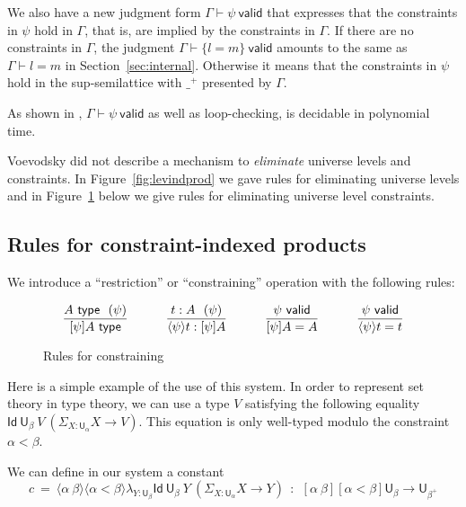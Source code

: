 \documentclass[11pt,a4paper]{article}
\theoremstyle{definition}
\newcommand{\Id}{\mathsf{Id}}
\newcommand{\UU}{\mathsf{U}}
\newcommand{\valid}{\mathsf{valid}}
\newcommand{\type}{\mathsf{type}}
\newcommand{\lam}[1]{{\langle}#1{\rangle}}
\newcommand{\set}[1]{\{#1\}}
\begin{document}

We also have a new judgment form $\Gamma\vdash\psi~\valid$ that expresses 
that the constraints in $\psi$ hold in $\Gamma$, that is,
are implied by the constraints in $\Gamma$. If there are
no constraints in $\Gamma$, the judgment $\Gamma\vdash\set{l=m}~\valid$
amounts to the same as $\Gamma\vdash l=m$ in Section~\ref{sec:internal}.
Otherwise it means that the constraints in $\psi$ hold in the 
sup-semilattice with $\_^+$ presented by $\Gamma$.

As shown in \cite{bezem-coquand:lattices}, $\Gamma\vdash\psi~\valid$
as well as loop-checking, is decidable in polynomial time.


Voevodsky \cite {VV} did not describe a mechanism to {\em eliminate}
universe levels and constraints. {\color{red}In Figure~\ref{fig:levindprod} we
gave rules for eliminating universe levels
and in Figure~\ref{fig:restriction} below we give rules
for eliminating universe level constraints.}

\subsection*{Rules for constraint-indexed products}%
We introduce a ``restriction'' or ``constraining'' operation with
the following rules:
\begin{figure}[H]
  \caption{Rules for constraining}%
  \label{fig:restriction}
$$
\frac{A~\type~~(\psi)}{[\psi]A~\type}~~~~~~~~~
\frac{{t}:A~~(\psi)}{\lam{\psi}{t}:[\psi]A}~~~~~~~~~
\frac{\psi~\valid}{[\psi]A = A}~~~~~~~~~
\frac{\psi~\valid}{\lam{\psi}{t} = t}
\belowdisplayshortskip 1pt
$$
\end{figure}


Here is a simple example of the use of this system. 
In order to represent set theory in type
theory, we can use a type $V$ satisfying the following equality $\Id~{\UU_{\beta}}~V~(\Sigma_{X:\UU_{\alpha}}X\rightarrow V)$.
This equation is only well-typed modulo the constraint $\alpha<\beta$.

We can define in our system a constant
$$
c~=~\lam{\alpha~\beta}\lam{\alpha<\beta}\lambda_{Y:\UU_{\beta}}\Id~{\UU_{\beta}}~Y~ (\Sigma_{X:\UU_{\alpha}}X\rightarrow Y)~~:~~
   [\alpha~\beta][\alpha<\beta]\UU_{\beta} \rightarrow \UU_{\beta^+}
$$
\end{document}
